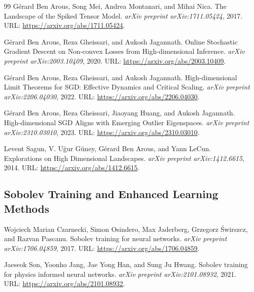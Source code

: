 \documentclass[a4paper]{article}
\theoremstyle{plain}
\theoremstyle{definition}
\theoremstyle{remark}
\begin{document}
\begin{thebibliography}{99}
\label{ref:benarous2019spiked_tensor}
Gérard Ben Arous, Song Mei, Andrea Montanari, and Mihai Nica.
The Landscape of the Spiked Tensor Model.
\textit{arXiv preprint arXiv:1711.05424}, 2017.
URL: \href{https://arxiv.org/abs/1711.05424}{\url{https://arxiv.org/abs/1711.05424}}.

\label{ref:benarous2021online_sgd}
Gérard Ben Arous, Reza Gheissari, and Aukosh Jagannath.
Online Stochastic Gradient Descent on Non-convex Losses from High-dimensional Inference.
\textit{arXiv preprint arXiv:2003.10409}, 2020.
URL: \href{https://arxiv.org/abs/2003.10409}{\url{https://arxiv.org/abs/2003.10409}}.

\label{ref:benarous2023high_dimensional_sgd}
Gérard Ben Arous, Reza Gheissari, and Aukosh Jagannath.
High-dimensional Limit Theorems for SGD: Effective Dynamics and Critical Scaling.
\textit{arXiv preprint arXiv:2206.04030}, 2022.
URL: \href{https://arxiv.org/abs/2206.04030}{\url{https://arxiv.org/abs/2206.04030}}.

\label{ref:benarous2023spectral_sgd_alignment}
Gérard Ben Arous, Reza Gheissari, Jiaoyang Huang, and Aukosh Jagannath.
High-dimensional SGD Aligns with Emerging Outlier Eigenspaces.
\textit{arXiv preprint arXiv:2310.03010}, 2023.
URL: \href{https://arxiv.org/abs/2310.03010}{\url{https://arxiv.org/abs/2310.03010}}.

\label{ref:benarous2014high_dimensional_landscapes}
Levent Sagun, V. Uğur Güney, Gérard Ben Arous, and Yann LeCun.
Explorations on High Dimensional Landscapes.
\textit{arXiv preprint arXiv:1412.6615}, 2014.
URL: \href{https://arxiv.org/abs/1412.6615}{\url{https://arxiv.org/abs/1412.6615}}.

\subsection*{Sobolev Training and Enhanced Learning Methods}

\label{ref:czarnecki2017sobolev}
Wojciech Marian Czarnecki, Simon Osindero, Max Jaderberg, Grzegorz Świrszcz, and Razvan Pascanu.
Sobolev training for neural networks.
\textit{arXiv preprint arXiv:1706.04859}, 2017.
URL: \href{https://arxiv.org/abs/1706.04859}{\url{https://arxiv.org/abs/1706.04859}}.

\label{ref:son2021sobolev}
Jaeseok Son, Yoonho Jang, Jae Yong Han, and Sung Ju Hwang.
Sobolev training for physics informed neural networks.
\textit{arXiv preprint arXiv:2101.08932}, 2021.
URL: \href{https://arxiv.org/abs/2101.08932}{\url{https://arxiv.org/abs/2101.08932}}.


\end{thebibliography}
\end{document}
